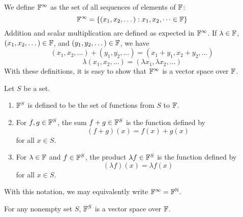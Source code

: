 \begin{example}[$\F^\infty$]
    We define $\F^\infty$ as the set of all sequences of elements of $\mathbb F$:
    \[ \mathbb F^\infty = \{ (x_1, x_2, \dots): x_1, x_2, \dots \in \mathbb F \} \]
    Addition and scalar multiplication are defined as expected in $\F^\infty$. If $\lambda\in \mathbb F$, $(x_1, x_2, \dots)\in \mathbb F$, and $(y_1, y_2, \dots)\in \mathbb F$, we have
    \[ (x_1, x_2, \dots) + (y_1, y_2, \dots) = (x_1 + y_1, x_2 + y_2, \dots) \]
    \[ \lambda(x_1, x_2, \dots) = (\lambda x_1, \lambda x_2, \dots) \]
    With these definitions, it is easy to show that $\F^\infty$ is a vector space over $\mathbb F$.
\end{example}
\begin{definition}[$\F^S$]
    Let $S$ be a set.
    \begin{enumerate}
        \item $\F^S$ is defined to be the set of functions from $S$ to $\mathbb F$.
        \item For $f,g\in \mathbb F^S$, the sum $f+g\in \mathbb F^S$ is the function defined by
        \[ (f+g)(x) = f(x) + g(x)\]
        for all $x\in S$.
        \item For $\lambda\in \mathbb F$ and $f\in \mathbb F^S$, the product $\lambda f\in \mathbb F^S$ is the function defined by
        \[ (\lambda f)(x) = \lambda f(x) \]
        for all $x\in S$.
    \end{enumerate}
\end{definition}
With this notation, we may equivalently write $\mathbb F^\infty = \mathbb F^{\mathbb{N}}$. 
\begin{theorem}
    For any nonempty set $S$, $\F^S$ is a vector space over $\mathbb F$.
\end{theorem}
